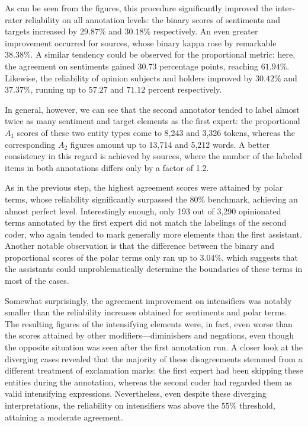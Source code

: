 As can be seen from the figures, this procedure significantly improved
the inter-rater reliability on all annotation levels: the binary
scores of sentiments and targets increased by $29.87\%$ and $30.18\%$
respectively.  An even greater improvement occurred for sources, whose
binary kappa rose by remarkable $38.38\%$.  A similar tendency could
be observed for the proportional metric: here, the agreement on
sentiments gained 30.73 percentage points, reaching $61.94\%$.
Likewise, the reliability of opinion subjects and holders improved by
$30.42\%$ and $37.37\%$, running up to $57.27$ and $71.12$ percent
respectively.

In general, however, we can see that the second annotator tended to
label almost twice as many sentiment and target elements as the first
expert: the proportional $A_1$ scores of these two entity types come
to 8,243 and 3,326 tokens, whereas the corresponding $A_2$ figures
amount up to 13,714 and 5,212 words.  A better consistency in this
regard is achieved by sources, where the number of the labeled items
in both annotations differs only by a factor of 1.2.

As in the previous step, the highest agreement scores were attained by
polar terms, whose reliability significantly surpassed the
80\% benchmark, achieving an almost perfect level.  Interestingly
enough, only 193 out of 3,290 opinionated terms annotated by the first
expert did not match the labelings of the second coder, who again
tended to mark generally more elements than the first assistant.
Another notable observation is that the difference between the binary
and proportional scores of the polar terms only ran up to
3.04\%, which suggests that the assistants could unproblematically
determine the boundaries of these terms in most of the cases.

Somewhat surprisingly, the agreement improvement on intensifiers was
notably smaller than the reliability increases obtained for sentiments
and polar terms.  The resulting figures of the intensifying elements
were, in fact, even worse than the scores attained by other
modifiers---diminishers and negations, even though the opposite
situation was seen after the first annotation run.  A closer look at
the diverging cases revealed that the majority of these disagreements
stemmed from a different treatment of exclamation marks: the first
expert had been skipping these entities during the annotation, whereas
the second coder had regarded them as valid intensifying expressions.
Nevertheless, even despite these diverging interpretations, the
reliability on intensifiers was above the $55\%$ threshold, attaining
a moderate agreement.

